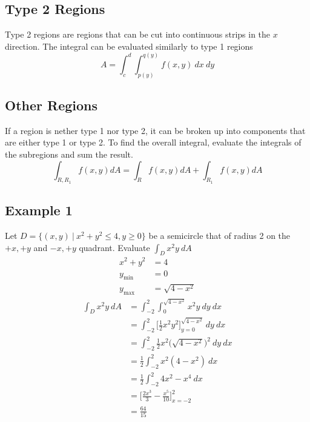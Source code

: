 \documentclass{article}
\theoremstyle{mytheoremstyle}
\theoremstyle{mytheoremstyle}
\theoremstyle{myproblemstyle}
\begin{document}
    \subsection*{Type 2 Regions}
    Type 2 regions are regions that can be cut into continuous strips in the $x$
    direction. The integral can be evaluated similarly to type 1 regions
    \[
        A = \int_{c}^{d} \int_{p(y)}^{q(y)} f(x,y) \ dx \ dy
    \]

    \subsection*{Other Regions}
    If a region is nether type 1 nor type 2, it can be broken up into components
    that are either type 1 or type 2. To find the overall integral, evaluate the
    integrals of the subregions and sum the result.
    \[
        \int_{R,R_1} f(x,y) dA = \int_R f(x,y) dA + \int_{R_1} f(x,y) dA
    \]

    \subsection*{Example 1}
    Let $D=\{(x,y)\ |\ x^2+y^2\le4, y\ge 0\}$ be a semicircle that of radius 2
    on the $+x,+y$ and $-x,+y$ quadrant. Evaluate $\int_D x^2y \ dA$
    \begin{align*}
        x^2 + y^2 &= 4 \\
        y_{\text{min}} &= 0 \\
        y_{\text{max}} &= \sqrt{4-x^2}
    \end{align*}
    \begin{align*}
        \int_D x^2y\ dA 
        &= \int_{-2}^{2} \int_{0}^{\sqrt{4-x^2}} x^2y \ dy \ dx \\
        &= \int_{-2}^{2} \Big[ \frac{1}{2} x^2y^2\Big]_{y=0}^{\sqrt{4-x^2}} \ dy \ dx \\
        &= \int_{-2}^{2} \frac{1}{2} x^2\Big(\sqrt{4-x^2}\Big)^2 \ dy \ dx \\
        &= \frac{1}{2} \int_{-2}^{2} x^2(4-x^2) \ dx \\
        &= \frac{1}{2} \int_{-2}^{2} 4x^2 - x^4 \ dx \\
        &= \Big[ \frac{2x^3}{3} - \frac{x^5}{10} \Big]_{x=-2}^{2} \\
        &= \frac{64}{15}
    \end{align*}
\end{document}
